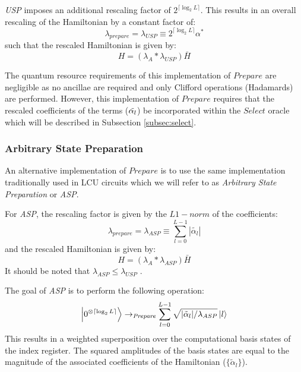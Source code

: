 \textit{USP} imposes an additional rescaling factor of $2^{\lceil \log_2{L} \rceil}$.
This results in an overall rescaling of the Hamiltonian by a constant factor of:
\begin{equation}
    \label{eq:usp-rescaling}
    \lambda_{prepare} = \lambda_{USP} \equiv 2^{\lceil \log_2{L} \rceil} \alpha^*
\end{equation}
such that the rescaled Hamiltonian is given by:
\begin{equation}
    \label{Hbar scale}
    H = (\lambda_A * \lambda_{USP}) \bar{H}
\end{equation}

The quantum resource requirements of this implementation of $\textit{Prepare}$ are negligible as no ancillae are required and only Clifford operations (Hadamards) are performed.
However, this implementation of $\textit{Prepare}$ requires that the rescaled coefficients of the terms ($\Tilde{\alpha_l}$) be incorporated within the $\textit{Select}$ oracle which will be described in Subsection \ref{subsec:select}.

\subsubsection{Arbitrary State Preparation}
\label{subsubsec:asp}

An alternative implementation of $\textit{Prepare}$ is to use the same implementation traditionally used in LCU circuits which we will refer to as \textit{Arbitrary State Preparation} or \textit{ASP}.

For \textit{ASP}, the rescaling factor is given by the $L1-norm$ of the coefficients:
\begin{equation}
    \label{eq:asp-scale}
    \lambda_{prepare} = \lambda_{ASP} \equiv \sum_{l=0}^{L-1} | \tilde{\alpha_l} |
\end{equation}
and the rescaled Hamiltonian is given by:
\begin{equation}
    H = (\lambda_A * \lambda_{ASP}) \bar{H}
\end{equation}
It should be noted that $\lambda_{ASP} \leq \lambda_{USP}$  .

The goal of \textit{ASP} is to perform the following operation:
\begin{equation}
    \ket{0^{\otimes \lceil \log_2{L} \rceil}} \rightarrow_{\textit{Prepare}} \sum_{l = 0}^{L-1} \sqrt{|\tilde{\alpha}_l| / \lambda_{ASP}} \ket{l}
\end{equation}
This results in a weighted superposition over the computational basis states of the index register.
The squared amplitudes of the basis states are equal to the magnitude of the associated coefficients of the Hamiltonian ($\{\tilde{\alpha}_l\}$).

